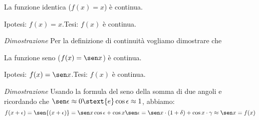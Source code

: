 \begin{teorema}
La funzione identica (\(f(x) = x\)) è continua.
\end{teorema}

\noindent Ipotesi: \(f(x)=x\).\tab Tesi: \(f(x)\) è continua.

\emph{Dimostrazione}
Per la definizione di continuità vogliamo dimostrare che 


\begin{comment}

\affiancati{.49}{.49}{
}{
\begin{center}  \end{center}
}
\end{comment}

\begin{teorema}
La funzione seno (\(f(x) = \sen x\)) è continua.
\end{teorema}

\noindent Ipotesi: \(f(x)=\sen x\).\tab Tesi: \(f(x)\) è continua.

\begin{center} \continuitafseno \end{center}

\noindent \emph{Dimostrazione}
Usando la formula del seno della somma di due angoli e ricordando che 
\(\sen \epsilon \approx 0 \stext{e} \cos \epsilon \approx 1\),
abbiamo:
\[f(x+\epsilon) =
\sen{(x+\epsilon)} = \sen x \cos \epsilon + \cos x \sen \epsilon = 
\sen x \cdot (1 + \delta) + \cos x \cdot \gamma \approx
\sen x = f(x)\]

